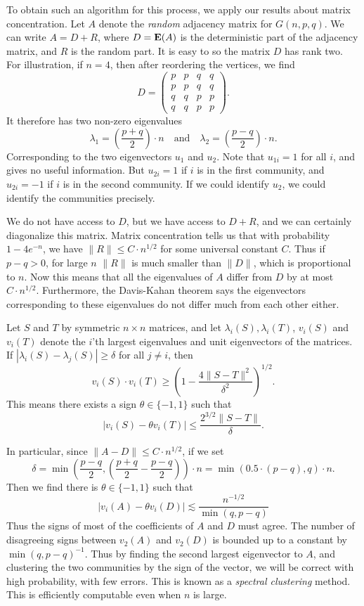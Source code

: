 To obtain such an algorithm for this process, we apply our results about matrix concentration. Let $A$ denote the \emph{random} adjacency matrix for $G(n,p,q)$. We can write $A = D + R$, where $D = \operatorname{\mathbf{E}}(A)$ is the deterministic part of the adjacency matrix, and $R$ is the random part. It is easy to so the matrix $D$ has rank two. For illustration, if $n = 4$, then after reordering the vertices, we find
%
\[ D = \begin{pmatrix} p & p & q & q \\ p & p & q & q \\ q & q & p & p \\ q & q & p & p \end{pmatrix}. \]
%
It therefore has two non-zero eigenvalues
%
\[ \lambda_1 = \left( \frac{p + q}{2} \right) \cdot n\quad\text{and}\quad \lambda_2 = \left( \frac{p - q}{2} \right) \cdot n. \]
%
Corresponding to the two eigenvectors $u_1$ and $u_2$. Note that $u_{1i} = 1$ for all $i$, and gives no useful information. But $u_{2i} = 1$ if $i$ is in the first community, and $u_{2i} = -1$ if $i$ is in the second community. If we could identify $u_2$, we could identify the communities precisely.

We do not have access to $D$, but we have access to $D + R$, and we can certainly diagonalize this matrix. Matrix concentration tells us that with probability $1 - 4e^{-n}$, we have $\| R \| \leq C \cdot n^{1/2}$ for some universal constant $C$. Thus if $p - q > 0$, for large $n$ $\| R \|$ is much smaller than $\| D \|$, which is proportional to $n$. Now this means that all the eigenvalues of $A$ differ from $D$ by at most $C \cdot n^{1/2}$. Furthermore, the Davis-Kahan theorem says the eigenvectors corresponding to these eigenvalues do not differ much from each other either.

\begin{theorem}
	Let $S$ and $T$ by symmetric $n \times n$ matrices, and let $\lambda_i(S), \lambda_i(T)$, $v_i(S)$ and $v_i(T)$ denote the $i$'th largest eigenvalues and unit eigenvectors of the matrices. If $|\lambda_i(S) - \lambda_j(S)| \geq \delta$ for all $j \neq i$, then
	\[ v_i(S) \cdot v_i(T) \geq \left( 1 - \frac{4 \| S - T \|^2}{\delta^2} \right)^{1/2}. \]
	This means there exists a sign $\theta \in \{ -1, 1 \}$ such that
	\[ |v_i(S) - \theta v_i(T)| \leq \frac{2^{3/2} \| S - T \|}{\delta}. \]
\end{theorem}

In particular, since $\| A - D \| \leq C \cdot n^{1/2}$, if we set
%
\[ \delta = \min \left( \frac{p - q}{2}, \left( \frac{p + q}{2} - \frac{p - q}{2} \right) \right) \cdot n = \min(0.5 \cdot (p-q), q) \cdot n. \]
%
Then we find there is $\theta \in \{ -1 , 1 \}$ such that
%
\[ |v_i(A) - \theta v_i(D)| \lesssim \frac{n^{-1/2}}{\min(q,p-q)} \]
%
Thus the signs of most of the coefficients of $A$ and $D$ must agree. The number of disagreeing signs between $v_2(A)$ and $v_2(D)$ is bounded up to a constant by $\min(q,p-q)^{-1}$. Thus by finding the second largest eigenvector to $A$, and clustering the two communities by the sign of the vector, we will be correct with high probability, with few errors. This is known as a \emph{spectral clustering} method. This is efficiently computable even when $n$ is large.

